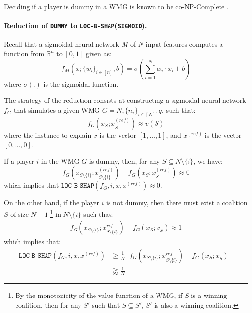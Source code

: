 Deciding if a player is dummy in a WMG is known to be co-NP-Complete \cite{freixas2011complexity}.

\begin{comment}
An interesting characterization of dummy players in WMGs highlighted in the following proposition. This characterization will prove useful in our reduction proof to our target problems that will be detailed:
\begin{proposition}\label{prop:characterization_dummyplayers}
      Let $G = (N,\{n_{i}\}_{i \in [N]}, q)$ be a WMG. A player $i \in [N]$ is dummy if and only if:
     \begin{equation} \label{eq:expression}
     \forall S \subseteq [N] \setminus \{i\}:~~ \sum\limits_{j \in S} n_{j}  \notin [q - n_{i}, q]
     \end{equation}
\end{proposition}
The proof of this proposition can be found in Appendix. 
\end{comment}

\paragraph{Reduction of \texttt{DUMMY} to \texttt{LOC-B-SHAP}(\texttt{SIGMOID}).} Recall that a sigmoidal neural network $M$ of $N$ input features computes a function from $\mathbb{R}^{n}$ to $[0,1]$ given as:
$$f_{M}(x; \{w_{i}\}_{i \in [n]}, b) = \sigma(\sum\limits_{i = 1}^{N} w_{i} \cdot x_{i} + b)$$
where $\sigma(.)$ is the sigmoidal function. 

The strategy of the reduction consists at constructing a sigmoidal neural network $f_{G}$ that simulates a given WMG $G= N, \{n_{i}\}_{i \in [N]}, q$, such that: 
$$f_{G}(x_{S}; x_{\bar{S}}^{(ref)}) \approx v(S)$$
where the instance to explain $x$ is the vector $[1, \ldots, 1]$, and $x^{(ref)}$ is the vector $[0, \ldots, 0]$. 

If a player $i$ in the WMG $G$ is dummy, then, for any $S \subseteq N \setminus \{i\}$, we have:
$$f_{G}(x_{S \setminus \{i\}}; x_{\bar{S \setminus \{i\}}}^{(ref)}) - f_{G}(x_{S}; x_{\bar{S}}^{(ref)}) \approx 0$$
which implies that $\texttt{LOC-B-SHAP}(f_{G}, i, x, x^{(ref)}) \approx 0$. 

On the other hand, if the player $i$ is not dummy, then there must exist a coalition $S$ of size $N-1$ \footnote{By the monotonicity of the value function of a WMG, if $S$ is a winning coalition, then for any $S'$ such that $S \subseteq S'$, $S'$ is also a winning coalition.} in $N \setminus \{i\}$ such that: 
\begin{align*}
    f_{G}(x_{S \setminus \{i\}}; x_{\bar{S\setminus \{i\}}}^{ref}) - f_{G}(x_{S}; x_{\bar{S}}) \approx 1
\end{align*}
which implies that:
{\small 
\begin{align*}
\texttt{LOC-B-SHAP}(f_{G},i,x,x^{(ref)}) & \geq \frac{1}{N} [f_{G}(x_{S \setminus \{i\}}; x_{\bar{S\setminus \{i\}}}^{ref}) - f_{G}(x_{S}; x_{\bar{S}})] \\
    &\gtrapprox \frac{1}{N}
\end{align*}
}

